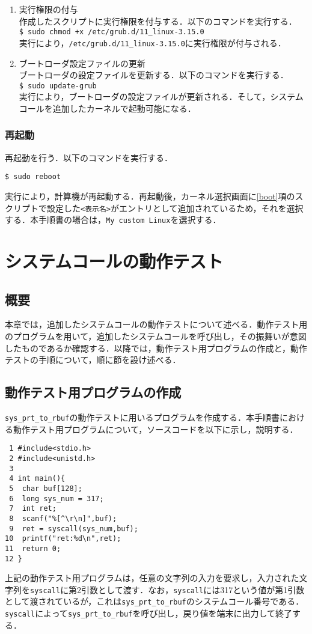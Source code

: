 \documentclass[12pt]{jsarticle}
\begin{document}
\begin{enumerate}
\item 実行権限の付与\\
  作成したスクリプトに実行権限を付与する．以下のコマンドを実行する．\\
  \verb|$ sudo chmod +x /etc/grub.d/11_linux-3.15.0|\\
  実行により，\verb|/etc/grub.d/11_linux-3.15.0|に実行権限が付与される．
\item ブートローダ設定ファイルの更新\\
  ブートローダの設定ファイルを更新する．以下のコマンドを実行する．\\
  \verb|$ sudo update-grub|\\
  実行により，ブートローダの設定ファイルが更新される．そして，システムコールを追加したカーネルで起動可能になる．
\end{enumerate}
\subsubsection{再起動}
再起動を行う．以下のコマンドを実行する．
\begin{verbatim}
$ sudo reboot
\end{verbatim}
  実行により，計算機が再起動する．再起動後，カーネル選択画面に\ref{boot}項のスクリプトで設定した\verb|<表示名>|がエントリとして追加されているため，それを選択する．本手順書の場合は，\verb|My custom Linux|を選択する．
\section{システムコールの動作テスト}
\subsection{概要}
本章では，追加したシステムコールの動作テストについて述べる．動作テスト用のプログラムを用いて，追加したシステムコールを呼び出し，その振舞いが意図したものであるか確認する．以降では，動作テスト用プログラムの作成と，動作テストの手順について，順に節を設け述べる．
\subsection{動作テスト用プログラムの作成}
\verb|sys_prt_to_rbuf|の動作テストに用いるプログラムを作成する．本手順書における動作テスト用プログラムについて，ソースコードを以下に示し，説明する．
\begin{verbatim}
 1 #include<stdio.h>
 2 #include<unistd.h>
 3
 4 int main(){
 5  char buf[128];
 6  long sys_num = 317;
 7  int ret;
 8  scanf("%[^\r\n]",buf);
 9  ret = syscall(sys_num,buf);
10  printf("ret:%d\n",ret);
11  return 0;
12 }
\end{verbatim}
上記の動作テスト用プログラムは，任意の文字列の入力を要求し，入力された文字列を\verb|syscall|に第2引数として渡す．なお，\verb|syscall|には317という値が第1引数として渡されているが，これは\verb|sys_prt_to_rbuf|のシステムコール番号である．\verb|syscall|によって\verb|sys_prt_to_rbuf|を呼び出し，戻り値を端末に出力して終了する．
\end{document}
